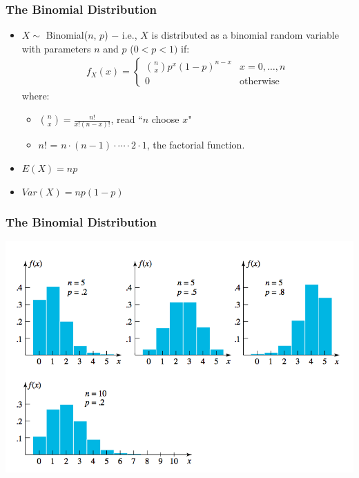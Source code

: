 \documentclass[handout]{beamer}\usepackage[]{graphicx}\usepackage[]{color}
\numberwithin{equation}{section}
\begin{document}
\begin{frame}
\frametitle{The Binomial Distribution}
\begin{itemize}
\pause \item $X \sim$ Binomial($n$, $p$) $-$ i.e., $X$ is distributed as a binomial random variable with parameters $n$ and $p$ ($0 < p < 1)$ if:
\pause \begin{align*}
f_X(x) = 
\begin{cases}
\binom{n}{x} p^x (1-p)^{n-x} & x = 0, \ldots, n\\
0 & \text{otherwise} 
\end{cases}
\end{align*}
where: 
\begin{itemize}
\pause \item $\binom{n}{x} = \frac{n!}{x!(n-x)!}$, read ``$n$ choose $x$"
\pause \item $n!$ = $n \cdot (n-1) \cdot \cdots \cdot 2 \cdot 1$, the factorial function.
\end{itemize}
\pause \item $E(X) = np$
\pause \item $Var(X) = np(1-p)$
\end{itemize}
\end{frame}

\begin{frame}
\frametitle{The Binomial Distribution}
 \includegraphics{../../fig/binombar.png}
\end{frame}
\end{document}
